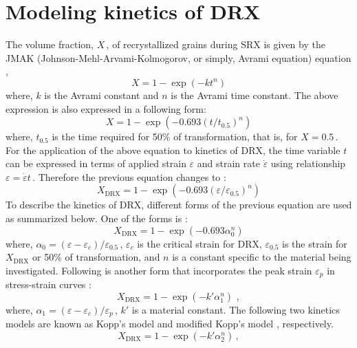 \documentclass[a4paper, 11pt, dvipsnames]{article}
\begin{document}
\section{Modeling kinetics of DRX}
The volume fraction, $X\,$, of recrystallized grains during SRX is given by the JMAK (Johnson\hyp Mehl\hyp Arvami\hyp Kolmogorov, or simply, Avrami equation) equation \cite{X0},
\begin{equation*}
X = 1 - \exp(-kt^n)
\end{equation*}
where, $k$ is the Avrami constant and $n$ is the Avrami time constant. The above expression is also expressed in a following form:
\begin{equation*}
X = 1 - \exp\left(-0.693\left(t/t_{0.5}\right)^n\right)
\end{equation*}
where, $t_{0.5}$ is the time required for 50\% of transformation, that is, for $X = 0.5\,$. For the application of the above equation to kinetics of DRX, the time variable $t$ can be expressed in terms of applied strain $\varepsilon$ and strain rate $\dot{\varepsilon}$ using relationship $\varepsilon = \dot{\varepsilon}t\,$. Therefore the previous equation changes to \cite{B4}:
\begin{equation}\label{JMAK-DRX}
X_\text{DRX} = 1 - \exp\left(-0.693\left(\varepsilon/\varepsilon_{0.5}\right)^n\right)
\end{equation}
To describe the kinetics of DRX, different forms of the previous equation are used as summarized below.  One of the forms is \cite{C1, X1}:
\begin{equation}\label{JMAK-DRX-1}
X_\text{DRX} = 1 - \exp\left(-0.693\alpha_0^{n}\right)
\end{equation}
where, $\alpha_0 = (\varepsilon - \varepsilon_c)/\varepsilon_{0.5}\,$, $\varepsilon_c$ is the critical strain for DRX, $\varepsilon_{0.5}$ is the strain for $X_\text{DRX}$ or 50\% of transformation, and $n$ is a constant specific to the material being investigated. Following is another form that incorporates the peak strain $\varepsilon_{p}$ in stress-strain curves \cite{C1, X2, X3}:
\begin{equation*}
X_\text{DRX} = 1 - \exp\left(-k'\alpha_1^n\right)\, \, ,
\end{equation*}
where, $\alpha_1 = (\varepsilon - \varepsilon_c)/\varepsilon_{p}\,$, $k'$ is a material constant. The following two kinetics models are known as Kopp's model \cite{X4, X5} and modified Kopp's model \cite{C1}, respectively.
\begin{equation*}
X_\text{DRX} = 1 - \exp\left(-k'\alpha_2^{n}\right) \, ,
\end{equation*}
\end{document}
